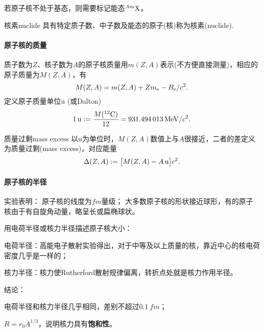 若原子核不处于基态，则需要标记能态$\nucli{Am}X$。
\begin{definition}{核素}{nuclide}
	具有特定质子数、中子数及能态的原子(核)称为核素(nuclide).
\end{definition}
\iffalse
\begin{definition}{原子核相关名词}{}
	\begin{compactitem}
		\item 核素：；
		\item 同位素：原子序数$Z$相同但质量数$A$不同的核素；
		\item 同位素丰度：元素中各同位素天然含量的原子数百分比；
		\item 同中异荷素：$N$相同，$Z$不同的核素；
		\item 同量异位素：$A$相同，$Z$(或$N$)不同的核素；
		\item 同质异能素：$Z$和$N$相同，而
		能态不同的核素；
		\item 偶$A$核、奇$A$核、偶偶核、奇奇核……
		\item 镜像核：$N$与$Z$互换的两个核素。
	\end{compactitem}
\end{definition}
\fi
\paragraph{原子核的质量}质子数为$Z$、核子数为$A$的原子核质量用$m(Z,A)$表示(不方便直接测量)，相应的原子质量为$M(Z,A)$，有
\[
	M(Z,A)=m(Z,A)+Zm_\elc-B_\elc/c^2.
\]
定义原子质量单位u (或Dalton)
\[
	\SI{1}{u}:=\frac{M(\nucli{12}C)}{12}=\SI{931.494013}{MeV}/c^2.
\]
\begin{definition}{质量过剩}{mass excess}
	以u为单位时，$M(Z,A)$数值上与$A$很接近，二者的差定义为质量过剩(mass excess)，对应能量
	\begin{align}
		\D(Z,A):=\bigfkh{M(Z,A)-A\,\si{u}}c^2.
	\end{align}
\end{definition}
\paragraph{原子核的半径}
实验表明：
原子核的线度为$\si{fm}$量级；
大多数原子核的形状接近球形，有的原子核由于有自旋角动量，略呈长或扁椭球状。

用电荷半径或核力半径描述原子核大小：
\begin{compactitem}
	\item 电荷半径：高能电子散射实验得出，对于中等及以上质量的核，靠近中心的核电荷密度几乎是一样的；
	\item 核力半径：核力使Rutherford散射规律偏离，转折点处就是核力作用半径。
\end{compactitem}
结论：
\begin{compactenum}
	\item 电荷半径和核力半径几乎相同，差别不超过$\SI{0.1}{fm}$；
	\item $R=r_0A^{1/3}$，说明核力具有\textbf{饱和性}。
\end{compactenum}

